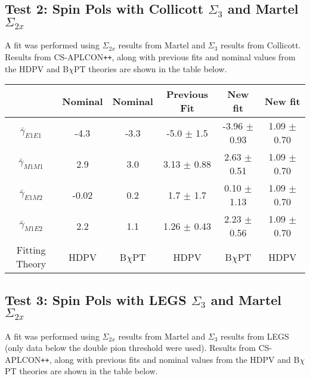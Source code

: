 \documentclass[]{article}
\begin{document}
\newpage

\subsection{Test 2: Spin Pols with Collicott $\Sigma_{3}$ and Martel $\Sigma_{2x}$}\label{Section:CollicottTest}

A fit was performed using $\Sigma_{2x}$ results from Martel and $\Sigma_{3}$ results from Collicott. Results from CS-APLCON\texttt{++}, along with previous fits and nominal values from the HDPV and B$\chi$PT theories are shown in the table below.

\begin{table}[h!]
	\centering %
	\begin{tabular}{|c|cc|c|c|c|} %
		\hline
		& Nominal & Nominal & Previous Fit & New fit & New fit\\
		\hline %
		$\bar{\gamma}_{E1E1}$ & -4.3 & -3.3 & -5.0 $\pm$ 1.5  & -3.96 $\pm$ 0.93 & 1.09 $\pm$ 0.70 \\ 
		$\bar{\gamma}_{M1M1}$ & 2.9 & 3.0   & 3.13 $\pm$ 0.88 &  2.63 $\pm$ 0.51 & 1.09 $\pm$ 0.70\\
		$\bar{\gamma}_{E1M2}$ & -0.02 & 0.2 & 1.7 $\pm$ 1.7   &  0.10 $\pm$ 1.13 & 1.09 $\pm$ 0.70\\
		$\bar{\gamma}_{M1E2}$ & 2.2 & 1.1   & 1.26 $\pm$ 0.43 &  2.23 $\pm$ 0.56 & 1.09 $\pm$ 0.70\\[0.5ex]
		\hline
		Fitting Theory & HDPV & B$\chi$PT & HDPV & B$\chi$PT& HDPV\\
		\hline
	\end{tabular}
\end{table}



\subsection{Test 3: Spin Pols with LEGS $\Sigma_{3}$ and Martel $\Sigma_{2x}$}\label{Section:LEGSTest}

A fit was performed using $\Sigma_{2x}$ results from Martel and $\Sigma_{3}$ results from LEGS (only data below the double pion threshold were used). Results from CS-APLCON\texttt{++}, along with previous fits and nominal values from the HDPV and B$\chi$PT theories are shown in the table below.
\end{document}
